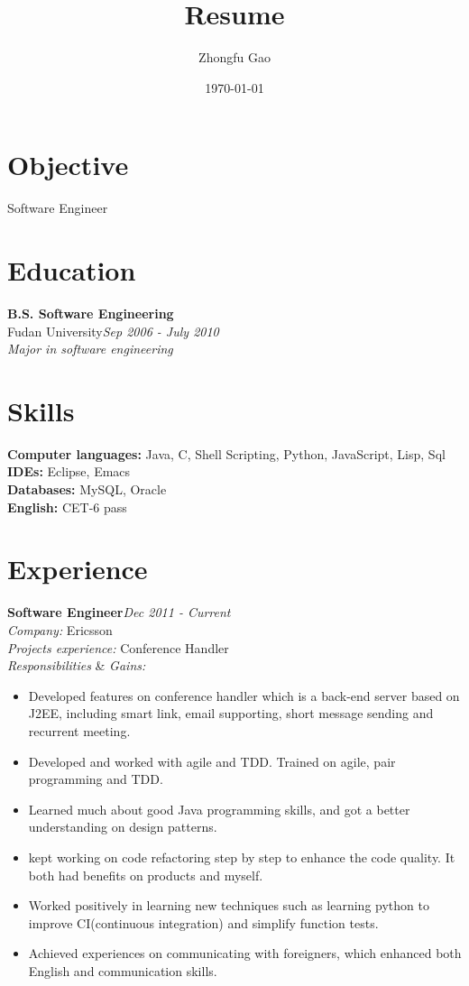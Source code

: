 \documentclass[line, margin, 11pt]{res}
\author{Zhongfu Gao}
\title{Resume}
\date{\today}
\begin{document}
\renewcommand{\namefont}{ \LARGE \bf } %
\address{{\bf Email: }joshuafufu@gmail.com}
\address{{\bf Mobile: }(+86)15921928229}

\begin{resume}

\section{Objective}
Software Engineer

\section{Education}
{\bf B.S. Software Engineering}\\
Fudan University\hfill {\it Sep 2006 - July 2010}\\
{\sl Major in software engineering}

\section{Skills}
{\bf Computer languages:} Java, C, Shell Scripting, Python, JavaScript, Lisp, Sql\\
{\bf IDEs:} Eclipse, Emacs\\
{\bf Databases:} MySQL, Oracle\\
{\bf English:} CET-6 pass


\section{Experience}

{\bf Software Engineer}\hfill {\it Dec 2011 - Current}\\
{\sl Company:} Ericsson\\
{\sl Projects experience:} Conference Handler\\
{\sl Responsibilities} \& {\sl Gains:}
\begin{itemize}
\item Developed features on conference handler which is a back-end server based on J2EE, including smart link, email supporting, short message sending and recurrent meeting.
\item Developed and worked with agile and TDD. Trained on agile, pair programming and TDD.
\item Learned much about good Java programming skills, and got a better understanding on design patterns.
\item kept working on code refactoring step by step to enhance the code quality. It both had benefits on products and myself.
\item Worked positively in learning new techniques such as learning python to improve CI(continuous integration) and simplify function tests.
\item Achieved experiences on communicating with foreigners, which enhanced both English and communication skills.
\end{itemize}


\end{resume}
\end{document}
